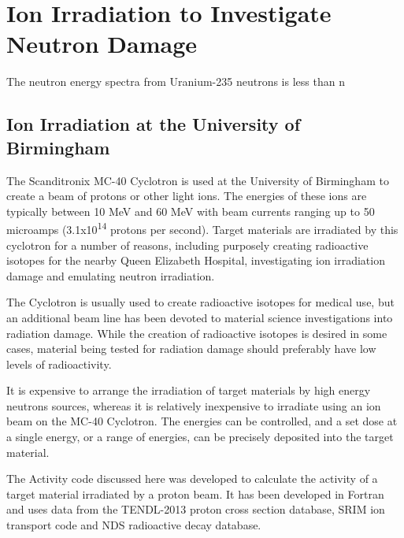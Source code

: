 


\section{Ion Irradiation to Investigate Neutron Damage}

The neutron energy spectra from Uranium-235 neutrons is less than n%





\subsection{Ion Irradiation at the University of Birmingham}

The Scanditronix MC-40 Cyclotron is used at the University of Birmingham to create a beam of protons or other light ions.  The energies of these ions are typically between 10 MeV and 60 MeV with beam currents ranging up to 50 microamps (3.1x10\textsuperscript{14} protons per second).  Target materials are irradiated by this cyclotron for a number of reasons, including purposely creating radioactive isotopes for the nearby Queen Elizabeth Hospital, investigating ion irradiation damage and emulating neutron irradiation.

The Cyclotron is usually used to create radioactive isotopes for medical use, but an additional beam line has been devoted to material science investigations into radiation damage.  While the creation of radioactive isotopes is desired in some cases, material being tested for radiation damage should preferably have low levels of radioactivity.

It is expensive to arrange the irradiation of target materials by high energy neutrons sources, whereas it is relatively inexpensive to irradiate using an ion beam on the MC-40 Cyclotron.  The energies can be controlled, and a set dose at a single energy, or a range of energies, can be precisely deposited into the target material.

The Activity code discussed here was developed to calculate the activity of a target material irradiated by a proton beam.  It has been developed in Fortran and uses data from the TENDL-2013 proton cross section database, SRIM ion transport code and NDS radioactive decay database.




